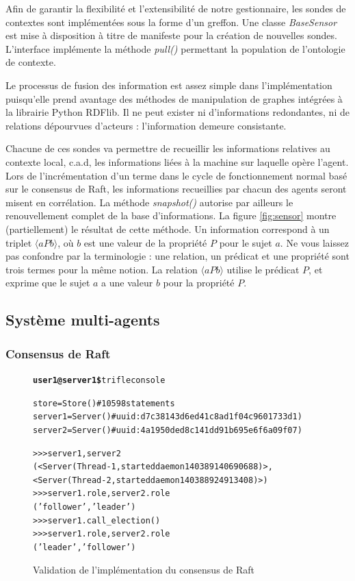Afin de garantir la flexibilité et l'extensibilité de notre gestionnaire, les
sondes de contextes sont implémentées sous la forme d'un greffon. Une classe
\emph{BaseSensor} est mise à disposition à titre de manifeste pour la création
de nouvelles sondes. L'interface implémente la méthode \emph{pull()} permettant
la population de l'ontologie de contexte.

Le processus de fusion des information est assez simple dans l'implémentation
puisqu'elle prend avantage des méthodes de manipulation de graphes intégrées à
la librairie Python RDFlib. Il ne peut exister ni d'informations redondantes, ni
de relations dépourvues d'acteurs : l'information demeure consistante.

Chacune de ces sondes va permettre de recueillir les informations relatives au
contexte local, c.a.d, les informations liées à la machine sur laquelle opère
l'agent. Lors de l'incrémentation d'un terme dans le cycle de fonctionnement
normal basé sur le consensus de Raft, les informations recueillies par chacun
des agents seront misent en corrélation. La méthode \emph{snapshot()} autorise
par ailleurs le renouvellement complet de la base d'informations.  La figure
\ref{fig:sensor} montre (partiellement) le résultat de cette méthode.  Un
information correspond à un triplet $\langle a P b \rangle$, où $b$ est une
valeur de la propriété $P$ pour le sujet $a$. Ne vous laissez pas confondre par
la terminologie : une relation, un prédicat et une propriété sont trois termes
pour la même notion. La relation $\langle a P b \rangle$ utilise le prédicat
$P$, et exprime que le sujet $a$ a une valeur $b$ pour la propriété $P$.

\subsection{Système multi-agents}

\subsubsection{Consensus de Raft}

\begin{figure}
  \begin{alltt}\scriptsize
    \textbf{user1@server1\$} trifle console

    store   = Store()  # 10598 statements
    server1 = Server() # uuid: d7c38143d6ed41c8ad1f04c9601733d1)
    server2 = Server() # uuid: 4a1950ded8c141dd91b695e6f6a09f07)
    
    >>> server1, server2
    (<Server(Thread-1, started daemon 140389140690688)>, 
     <Server(Thread-2, started daemon 140388924913408)>)
    >>> server1.role, server2.role
    ('follower', 'leader')
    >>> server1.call_election()
    >>> server1.role, server2.role
    ('leader', 'follower')
  \end{alltt}
  \caption{Validation de l'implémentation du consensus de Raft}
  \label{fig:raft}
\end{figure}

